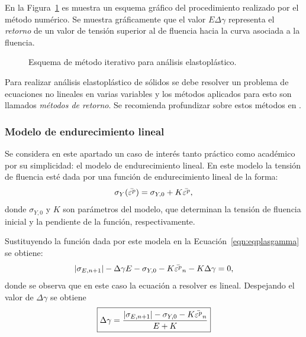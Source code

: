 En la Figura~\ref{fig:iterelasto} es muestra un esquema gráfico del procedimiento realizado por el método numérico. %
%
Se muestra gráficamente que el valor $E \Delta \gamma$ representa el \textit{retorno} de un valor de tensión superior al de fluencia hacia la curva asociada a la fluencia. %

\begin{figure}[htb]
\centering
\def\svgwidth{0.7\textwidth}	
%
\caption{Esquema de método iterativo para análisis elastoplástico.}
\label{fig:iterelasto}
\end{figure}
%

Para realizar análisis elastoplástico de sólidos se debe resolver un problema de ecuaciones no lineales en varias variables y los métodos aplicados para esto son llamados \textit{métodos de retorno}. %
%
Se recomienda profundizar sobre estos métodos en \citep{DeSouzaNeto2008}.


\subsubsection{Modelo de endurecimiento lineal}

Se considera en este apartado un caso de interés tanto práctico como académico por su simplicidad: el modelo de endurecimiento lineal. %
%
En este modelo la tensión de fluencia esté dada por una función de endurecimiento lineal de la forma:
%
\begin{equation}
  \sigma_Y(\bar{ \varepsilon^p}) = \sigma_{Y,0} + K \bar{ \varepsilon^p},
\end{equation} 
donde $\sigma_{Y,0}$ y $K$ son parámetros del modelo, que determinan la tensión de fluencia inicial y la pendiente de la función, respectivamente.


Sustituyendo la función dada por este modela en la Ecuación~\eqref{eqn:eqplasgamma} se obtiene:
%
\begin{equation}
|\sigma_{E,n+1}|- \Delta \gamma E - \sigma_{Y,0} - K \bar{ \varepsilon^p}_{n} - K \Delta \gamma = 0,
\end{equation}
donde se observa que en este caso la ecuación a resolver es lineal. %
%
Despejando el valor de $\Delta \gamma$ se obtiene
%
\begin{equation}
\boxed{
\Delta \gamma  = \frac{ |\sigma_{E,n+1}| - \sigma_{Y,0} - K \bar{ \varepsilon^p}_{n} }{ E+K} 
}
\end{equation}



